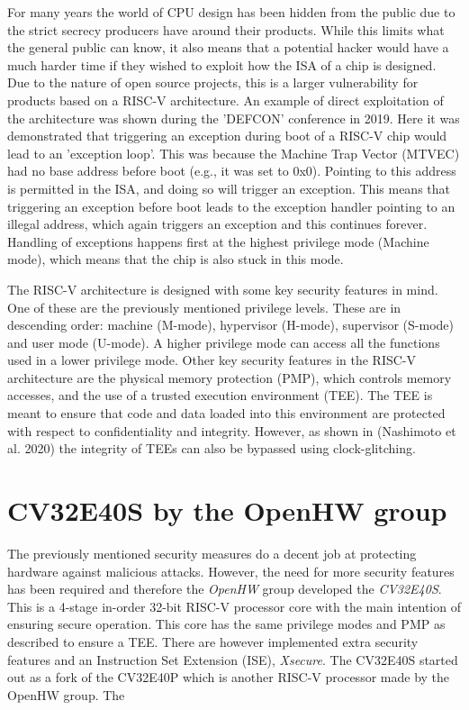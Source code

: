 For many years the world of CPU design has been hidden from the public due to the strict secrecy producers have around their products. While this limits what the general public can know, it also means that a potential hacker would have a much harder time if they wished to exploit how the ISA of a chip is designed. Due to the nature of open source projects, this is a larger vulnerability for products based on a RISC-V architecture. An example of direct exploitation of the architecture was shown during the 'DEFCON' conference in 2019\cite{isa_exploit}. Here it was demonstrated that triggering an exception during boot of a RISC-V chip would lead to an 'exception loop'. This was because the Machine Trap Vector (MTVEC) had no base address before boot (e.g., it was set to 0x0). Pointing to this address is permitted in the ISA, and doing so will trigger an exception. This means that triggering an exception before boot leads to the exception handler pointing to an illegal address, which again triggers an exception and this continues forever. Handling of exceptions happens first at the highest privilege mode (Machine mode), which means that the chip is also stuck in this mode. 

The RISC-V architecture is designed with some key security features in mind. One of these are the previously mentioned privilege levels. These are in descending order: machine (M-mode), hypervisor (H-mode), supervisor (S-mode) and user mode (U-mode). A higher privilege mode can access all the functions used in a lower privilege mode\cite{source2}. Other key security features in the RISC-V architecture are the physical memory protection (PMP), which controls memory accesses, and the use of a trusted execution environment (TEE). The TEE is meant to ensure that code and data loaded into this environment are protected with respect to confidentiality and integrity. However, as shown in (Nashimoto et al. 2020) the integrity of TEEs can also be bypassed using clock-glitching\cite{source2}.

\section{CV32E40S by the OpenHW group}
\label{sec:cv32}

The previously mentioned security measures do a decent job at protecting hardware against malicious attacks. However, the need for more security features has been required and therefore the \textit{OpenHW} group developed the \textit{CV32E40S}. This is a 4-stage in-order 32-bit RISC-V processor core with the main intention of ensuring secure operation\cite{cv32e40s_manual}. This core has the same privilege modes and PMP as described to ensure a TEE. There are however implemented extra security features and an Instruction Set Extension (ISE), \textit{Xsecure}. The CV32E40S started out as a fork of the CV32E40P which is another RISC-V processor made by the OpenHW group. The  


